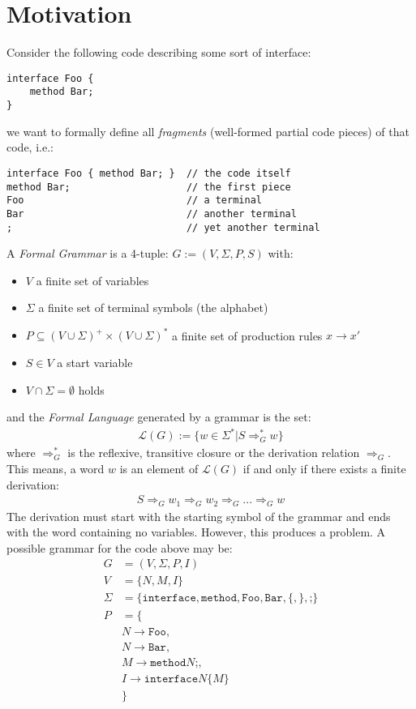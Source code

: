 \documentclass[runningheads,a4paper]{llncs}
\begin{document}
\section*{Motivation}
Consider the following code describing some sort of interface:
\begin{lstlisting}
interface Foo {
	method Bar;
}
\end{lstlisting}
we want to formally define all \textit{fragments} (well-formed partial code pieces) of that code, i.e.:
\begin{lstlisting}
interface Foo { method Bar; }  // the code itself
method Bar;                    // the first piece
Foo                            // a terminal
Bar                            // another terminal
;                              // yet another terminal
\end{lstlisting}
A \textit{Formal Grammar} is a 4-tuple:
$G := (V,\Sigma,P,S)$
with:
\begin{itemize}
\item $V$ a finite set of variables
\item $\Sigma$ a finite set of terminal symbols (the alphabet)
\item $P \subseteq (V \cup \Sigma)^+ \times (V \cup \Sigma)^*$ a finite set of production rules $x \rightarrow x'$
\item $S \in V$ a start variable
\item $V \cap \Sigma = \emptyset$ holds
\end{itemize}
and the \textit{Formal Language} generated by a grammar is the set:
\begin{align*}
\mathcal{L}(G) := \{ w \in \Sigma^* | S \Rightarrow_G^* w \}
\end{align*}
where $\Rightarrow_G^*$ is the reflexive, transitive closure or the derivation relation $\Rightarrow_G$.
This means, a word $w$ is an element of $\mathcal{L}(G)$ if and only if there exists a finite derivation:
\begin{align*}
S \Rightarrow_G w_1 \Rightarrow_G w_2 \Rightarrow_G ... \Rightarrow_G w
\end{align*} 
The derivation must start with the starting symbol of the grammar and ends with the word containing no variables.
However, this produces a problem.
A possible grammar for the code above may be:
\begin{align*}
G &= (V,\Sigma,P,I)
\\V &= \{N,M,I\}
\\\Sigma &= \{ \texttt{interface}, \texttt{method}, \texttt{Foo}, \texttt{Bar}, \texttt{\{}, \texttt{\}}, \texttt{;} \}
\\P &= \{
\\& N \rightarrow \texttt{Foo},
\\& N \rightarrow \texttt{Bar},
\\& M \rightarrow \texttt{method} N \texttt{;},
\\& I \rightarrow \texttt{interface} N \texttt{\{} M \texttt{\}} 
\\& \}
\end{align*}
\end{document}
